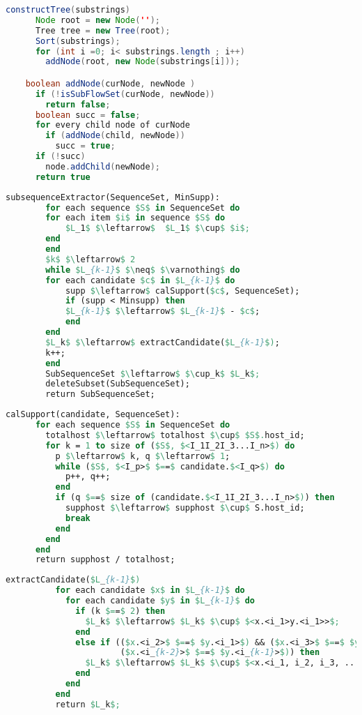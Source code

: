 \begin{lstlisting}[language=Java, caption=Алгоритм построения дерева подстрок]
    constructTree(substrings)
      Node root = new Node('');
      Tree tree = new Tree(root);
      Sort(substrings);
      for (int i =0; i< substrings.length ; i++)
        addNode(root, new Node(substrings[i]));

    boolean addNode(curNode, newNode )
      if (!isSubFlowSet(curNode, newNode))
        return false;
      boolean succ = false;
      for every child node of curNode
        if (addNode(child, newNode))
          succ = true;
      if (!succ)
        node.addChild(newNode);
      return true
    \end{lstlisting}

\begin{lstlisting}[language=Pascal, caption=Алгоритм выделения подпоследовательности, mathescape]
    subsequenceExtractor(SequenceSet, MinSupp):
        for each sequence $S$ in SequenceSet do
        for each item $i$ in sequence $S$ do
            $L_1$ $\leftarrow$  $L_1$ $\cup$ $i$;
        end
        end
        $k$ $\leftarrow$ 2
        while $L_{k-1}$ $\neq$ $\varnothing$ do
        for each candidate $c$ in $L_{k-1}$ do
            supp $\leftarrow$ calSupport($c$, SequenceSet);
            if (supp < Minsupp) then
            $L_{k-1}$ $\leftarrow$ $L_{k-1}$ - $c$;
            end
        end
        $L_k$ $\leftarrow$ extractCandidate($L_{k-1}$);
        k++;
        end
        SubSequenceSet $\leftarrow$ $\cup_k$ $L_k$;
        deleteSubset(SubSequenceSet);
        return SubSequenceSet;
    \end{lstlisting}

\begin{lstlisting}[language=Pascal, caption=Алгоритм вычисления поддержки, mathescape]
    calSupport(candidate, SequenceSet):
      for each sequence $S$ in SequenceSet do
        totalhost $\leftarrow$ totalhost $\cup$ $S$.host_id;
        for k = 1 to size of ($S$, $<I_1I_2I_3...I_n>$) do
          p $\leftarrow$ k, q $\leftarrow$ 1;
          while ($S$, $<I_p>$ $==$ candidate.$<I_q>$) do
            p++, q++;
          end
          if (q $==$ size of (candidate.$<I_1I_2I_3...I_n>$)) then
            supphost $\leftarrow$ supphost $\cup$ S.host_id;
            break
          end
        end
      end
      return supphost / totalhost;
    \end{lstlisting}


    \begin{lstlisting}[language=Pascal, caption=Алгоритм извлечения кандидата, mathescape]
        extractCandidate($L_{k-1}$)
          for each candidate $x$ in $L_{k-1}$ do
            for each candidate $y$ in $L_{k-1}$ do
              if (k $==$ 2) then
                $L_k$ $\leftarrow$ $L_k$ $\cup$ $<x.<i_1>y.<i_1>>$;
              end
              else if (($x.<i_2>$ $==$ $y.<i_1>$) && ($x.<i_3>$ $==$ $y.<i_2>$) && ...
                       ($x.<i_{k-2}>$ $==$ $y.<i_{k-1}>$)) then
                $L_k$ $\leftarrow$ $L_k$ $\cup$ $<x.<i_1, i_2, i_3, ..., i_{k-1}>y.<i_{k-1}>$;
              end
            end
          end
          return $L_k$;
        \end{lstlisting}



